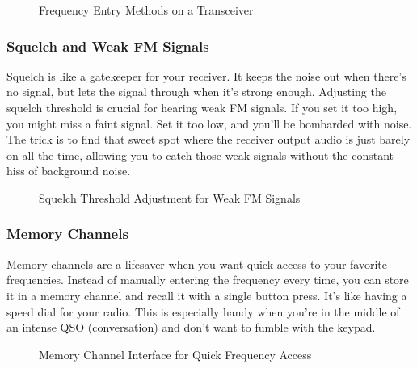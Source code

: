 \begin{figure}[h]
    \centering
    \caption{Frequency Entry Methods on a Transceiver}
    \label{fig:frequency-entry}
\end{figure}

\subsubsection*{Squelch and Weak FM Signals}

Squelch is like a gatekeeper for your receiver. It keeps the noise out when there’s no signal, but lets the signal through when it’s strong enough. Adjusting the squelch threshold is crucial for hearing weak FM signals. If you set it too high, you might miss a faint signal. Set it too low, and you’ll be bombarded with noise. The trick is to find that sweet spot where the receiver output audio is just barely on all the time, allowing you to catch those weak signals without the constant hiss of background noise.

\begin{figure}[h]
    \centering
    \caption{Squelch Threshold Adjustment for Weak FM Signals}
    \label{fig:squelch-threshold}
\end{figure}

\subsubsection*{Memory Channels}

Memory channels are a lifesaver when you want quick access to your favorite frequencies. Instead of manually entering the frequency every time, you can store it in a memory channel and recall it with a single button press. It’s like having a speed dial for your radio. This is especially handy when you’re in the middle of an intense QSO (conversation) and don’t want to fumble with the keypad.

\begin{figure}[h]
    \centering
    \caption{Memory Channel Interface for Quick Frequency Access}
    \label{fig:memory-channel}
\end{figure}


